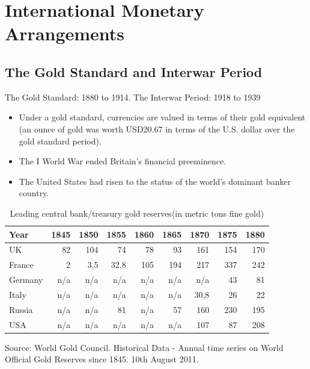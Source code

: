 \documentclass[international_finance_p1.tex]{subfiles}
\begin{document}
\section{International Monetary Arrangements}
\subsection{The Gold Standard and Interwar Period}
\begin{frame}{The Gold Standard: 1880 to 1914. The Interwar Period: 1918 to 1939}
\begin{itemize}[<+->]
\item
Under a gold standard, currencies are valued in terms of their gold equivalent (an ounce of gold was worth USD20.67 in terms of the U.S. dollar over the gold standard period). 
\item
The I World War ended Britain’s financial preeminence.
\item
The United States had risen to the status of the world’s dominant banker country.
\end{itemize}
\end{frame}
\begin{frame}{}
\begin{table}[htbp]
  \centering
  \fontsize{6pt}{6pt}\selectfont
  \caption{Leading central bank/treasury gold reserves(in metric tons fine gold)}
    \begin{tabular}{lrrrrrrrr}
    \toprule
    Year  & 1845  & 1850  & 1855  & 1860  & 1865  & 1870  & 1875  & 1880 \\
  \midrule
UK    & 82    & 104   & 74    & 78    & 93    & 161   & 154   & 170 \\
    France & 2     & 3,5   & 32,8  & 105   & 194   & 217   & 337   & 242 \\
    Germany & n/a   & n/a   & n/a   & n/a   & n/a   & n/a   & 43    & 81 \\
    Italy & n/a   & n/a   & n/a   & n/a   & n/a   & 30,8  & 26    & 22 \\
    Russia & n/a   & n/a   & 81    & n/a   & 57    & 160   & 230   & 195 \\
    USA   & n/a   & n/a   & n/a   & n/a   & n/a   & 107   & 87    & 208 \\
    \bottomrule
    \end{tabular}%
  \label{tab:addlabel}%

\raggedright
\footnotesize
Source: World Gold Council. Historical Data - Annual time series on 
World Official Gold Reserves since 1845. 10th August 2011.
\end{table}%
\end{frame}
\end{document}
